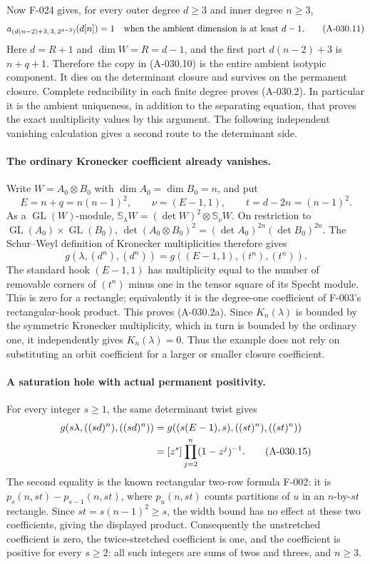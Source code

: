 Now F-024 gives, for every outer degree \(d\geq3\) and inner
degree \(n\geq3\),
\[
 a_{(d(n-2)+3,\,3,\,2^{d-3})}(d[n])=1
 \quad\hbox{when the ambient dimension is at least }d-1.         \tag{A-030.11}
\]
Here \(d=R+1\) and \(\dim W=R=d-1\), and the first part
\(d(n-2)+3\) is \(n+q+1\). Therefore the copy in
(A-030.10) is the entire ambient isotypic component. It dies
on the determinant closure and survives on the permanent closure.
Complete reducibility in each finite degree proves (A-030.2).
In particular it is the ambient uniqueness, in addition to the
separating equation, that proves the exact multiplicity values by
this argument. The following independent vanishing calculation
gives a second route to the determinant side.

\paragraph{The ordinary Kronecker coefficient already vanishes.}
Write \(W=A_0\otimes B_0\) with
\(\dim A_0=\dim B_0=n\), and put
\[
 E=n+q=n(n-1)^2,\qquad \nu=(E-1,1),\qquad
                         t=d-2n=(n-1)^2.
\]
As a \(\operatorname{GL}(W)\)-module,
\(\mathbb S_\lambda W=(\det W)^2\otimes\mathbb S_\nu W\).
On restriction to \(\operatorname{GL}(A_0)\times
\operatorname{GL}(B_0)\),
\(\det(A_0\otimes B_0)^2=(\det A_0)^{2n}(\det B_0)^{2n}\).
The Schur--Weyl definition of Kronecker multiplicities therefore gives
\[
 g(\lambda,(d^n),(d^n))
                         =g((E-1,1),(t^n),(t^n)).              \tag{A-030.14}
\]
The standard hook \((E-1,1)\) has multiplicity equal to the
number of removable corners of \((t^n)\) minus one in the
tensor square of its Specht module. This is zero for a rectangle;
equivalently it is the degree-one coefficient of F-003's
rectangular-hook product. This proves (A-030.2a).
Since \(K_n(\lambda)\) is bounded by the symmetric Kronecker
multiplicity, which in turn is bounded by the ordinary one,
it independently gives \(K_n(\lambda)=0\). Thus the example
does not rely on substituting an orbit coefficient for a larger
or smaller closure coefficient.

\paragraph{A saturation hole with actual permanent positivity.}
For every integer \(s\geq1\), the same determinant twist gives
\begin{align}
 g(s\lambda,((sd)^n),((sd)^n))
   &=g((s(E-1),s),((st)^n),((st)^n))\notag\\
   &=[z^s]\prod_{j=2}^{n}(1-z^j)^{-1}.                \tag{A-030.15}
\end{align}
The second equality is the known rectangular two-row formula
F-002: it is \(p_s(n,st)-p_{s-1}(n,st)\), where \(p_u(n,st)\)
counts partitions of \(u\) in an \(n\)-by-\(st\) rectangle.
Since \(st=s(n-1)^2\geq s\), the width bound has no effect at
these two coefficients, giving the displayed product.
Consequently the unstretched coefficient is zero, the
twice-stretched coefficient is one, and the coefficient is positive
for every \(s\geq2\): all such integers are sums of twos and threes,
and \(n\geq3\).

